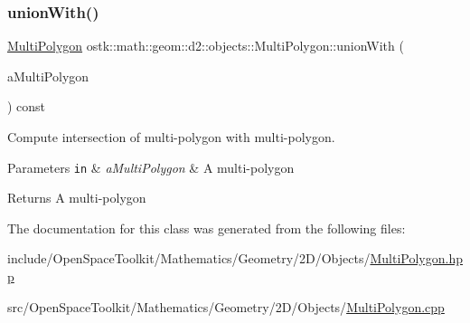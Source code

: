 \subsubsection{\texorpdfstring{union\+With()}{unionWith()}}
{\footnotesize\ttfamily \hyperlink{classostk_1_1math_1_1geom_1_1d2_1_1objects_1_1_multi_polygon}{Multi\+Polygon} ostk\+::math\+::geom\+::d2\+::objects\+::\+Multi\+Polygon\+::union\+With (\begin{DoxyParamCaption}\item[{const \hyperlink{classostk_1_1math_1_1geom_1_1d2_1_1objects_1_1_multi_polygon}{Multi\+Polygon} \&}]{a\+Multi\+Polygon }\end{DoxyParamCaption}) const}



Compute intersection of multi-\/polygon with multi-\/polygon. 


\begin{DoxyParams}[1]{Parameters}
\mbox{\tt in}  & {\em a\+Multi\+Polygon} & A multi-\/polygon \\
\hline
\end{DoxyParams}
\begin{DoxyReturn}{Returns}
A multi-\/polygon 
\end{DoxyReturn}


The documentation for this class was generated from the following files\+:\begin{DoxyCompactItemize}
\item 
include/\+Open\+Space\+Toolkit/\+Mathematics/\+Geometry/2\+D/\+Objects/\hyperlink{_multi_polygon_8hpp}{Multi\+Polygon.\+hpp}\item 
src/\+Open\+Space\+Toolkit/\+Mathematics/\+Geometry/2\+D/\+Objects/\hyperlink{_multi_polygon_8cpp}{Multi\+Polygon.\+cpp}\end{DoxyCompactItemize}
